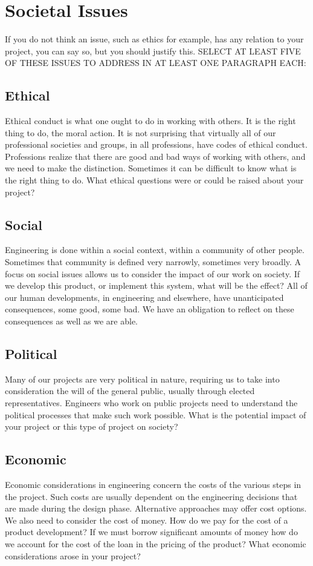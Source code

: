\chapter{Societal Issues}
If you do not think an issue, such as ethics for example, has any relation to your project, you can say so, but you should justify this. SELECT AT LEAST FIVE OF THESE ISSUES TO ADDRESS IN AT LEAST ONE PARAGRAPH EACH:

\section{Ethical}
Ethical conduct is what one ought to do in working with others. It is the right thing to do, the moral action. It is not surprising that virtually all of our professional societies and groups, in all professions, have codes of ethical conduct. Professions realize that there are good and bad ways of working with others, and we need to make the distinction. Sometimes it can be difficult to know what is the right thing to do. What ethical questions were or could be raised about your project?

\section{Social}
Engineering is done within a social context, within a community of other people. Sometimes that community is defined very narrowly, sometimes very broadly. A focus on social issues allows us to consider the impact of our work on society. If we develop this product, or implement this system, what will be the effect? All of our human developments, in engineering and elsewhere, have unanticipated consequences, some good, some bad. We have an obligation to reflect on these consequences as well as we are able.

\section{Political}
Many of our projects are very political in nature, requiring us to take into consideration the will of the general public, usually through elected representatives. Engineers who work on public projects need to understand the political processes that make such work possible. What is the potential impact of your project or this type of project on society?

\section{Economic}
Economic considerations in engineering concern the costs of the various steps in the project. Such costs are usually dependent on the engineering decisions that are made during the design phase. Alternative approaches may offer cost options. We also need to consider the cost of money. How do we pay for the cost of a product development? If we must borrow significant amounts of money how do we account for the cost of the loan in the pricing of the product? What economic considerations arose in your project?

